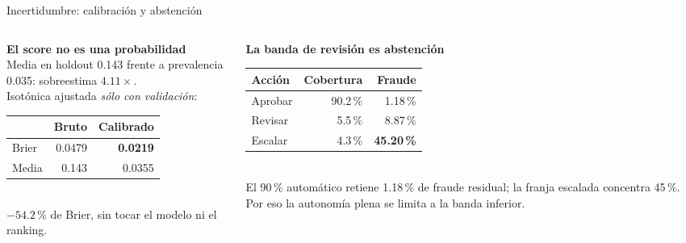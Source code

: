 \documentclass[aspectratio=169,10pt]{beamer}
\begin{document}
\begin{frame}{Incertidumbre: calibración y abstención}\small
\begin{columns}[T]
\begin{column}{.48\linewidth}
\textbf{El score no es una probabilidad}\\[1mm]
Media en holdout 0.143 frente a prevalencia 0.035: sobreestima $4.11\times$.\\[2mm]
Isotónica ajustada \emph{sólo con validación}:\\[1mm]
\begin{tabular}{@{}lrr@{}}\toprule
 & Bruto & Calibrado\\\midrule
Brier & 0.0479 & \textbf{0.0219}\\
Media & 0.143 & 0.0355\\\bottomrule
\end{tabular}\\[2mm]
$-54.2$\,\% de Brier, sin tocar el modelo ni el ranking.
\end{column}
\begin{column}{.48\linewidth}
\textbf{La banda de revisión es abstención}\\[1mm]
\begin{tabular}{@{}lrr@{}}\toprule
Acción & Cobertura & Fraude\\\midrule
Aprobar & 90.2\,\% & 1.18\,\%\\
Revisar & 5.5\,\% & 8.87\,\%\\
Escalar & 4.3\,\% & \textbf{45.20\,\%}\\\bottomrule
\end{tabular}\\[2mm]
El 90\,\% automático retiene 1.18\,\% de fraude residual; la franja escalada concentra 45\,\%. Por eso la autonomía plena se limita a la banda inferior.
\end{column}
\end{columns}
\end{frame}
\end{document}
